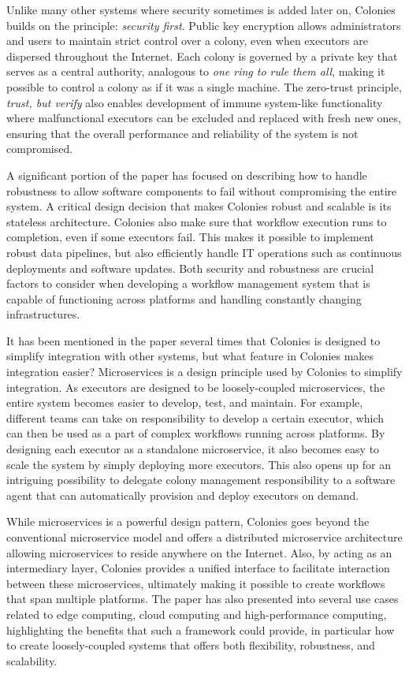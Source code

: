 \documentclass{article}
\begin{document}
Unlike many other systems where security sometimes is added later on, Colonies builds on the principle: \emph{security first}. Public key encryption allows administrators and users to maintain strict control over a colony, even when executors are dispersed throughout the Internet. Each colony is governed by a private key that serves as a central authority, analogous to \emph{one ring to rule them all}, making it possible to control a colony as if it was a single machine. The zero-trust principle, \emph{trust, but verify} also enables development of immune system-like functionality where malfunctional executors can be excluded and replaced with fresh new ones, ensuring that the overall performance and reliability of the system is not compromised. 

A significant portion of the paper has focused on describing how to handle robustness to allow software components to fail without compromising the entire system. A critical design decision that makes Colonies robust and scalable is its stateless architecture. Colonies also make sure that workflow execution runs to completion, even if some executors fail. This makes it possible to implement robust data pipelines, but also efficiently handle IT operations such as continuous deployments and software updates. Both security and robustness are crucial factors to consider when developing a workflow management system that is capable of functioning across platforms and handling constantly changing infrastructures. 

It has been mentioned in the paper several times that Colonies is designed to simplify integration with other systems, but what feature in Colonies makes integration easier? Microservices is a design principle used by Colonies to simplify integration. As executors are designed to be loosely-coupled microservices, the entire system becomes easier to develop, test, and maintain. For example, different teams can take on responsibility to develop a certain executor, which can then be used as a part of complex workflows running across platforms. By designing each executor as a standalone microservice, it also becomes easy to scale the system by simply deploying more executors. This also opens up for an intriguing possibility to delegate colony management responsibility to a software agent that can automatically provision and deploy executors on demand.

While microservices is a powerful design pattern, Colonies goes beyond the conventional microservice model and offers a distributed microservice architecture allowing microservices to reside anywhere on the Internet. Also, by acting as an intermediary layer, Colonies provides a unified interface to facilitate interaction between these microservices, ultimately making it possible to create workflows that span multiple platforms. The paper has also presented into several use cases related to edge computing, cloud computing and high-performance computing, highlighting the benefits that such a framework could provide, in particular how to create loosely-coupled systems that offers both flexibility, robustness, and scalability.
\end{document}
